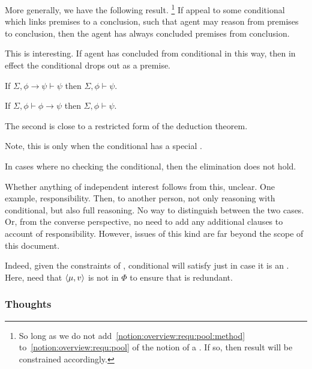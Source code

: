 \begin{note}
  More generally, we have the following result.%
  \footnote{
    So long as we do not add~\autoref{notion:overview:requ:pool:method} to~\autoref{notion:overview:requ:pool} of the notion of a \requ{}.
    If so, then result will be constrained accordingly.
  }
  If appeal to some conditional which links premises to a conclusion, such that agent may reason from premises to conclusion, then the agent has always concluded premises from conclusion.

  This is interesting.
  If agent has concluded from conditional in this way, then in effect the conditional drops out as a premise.

  If \(\Sigma, \phi \rightarrow \psi \vdash \psi\) then \(\Sigma, \phi \vdash \psi\).

  If \(\Sigma, \phi \vdash \phi \rightarrow \psi\) then \(\Sigma, \phi \vdash \psi\).

  The second is close to a restricted form of the deduction theorem.

  Note, this is only when the conditional has a special \requ{}.

  In cases where no checking the conditional, then the elimination does not hold.

  Whether anything of independent interest follows from this, unclear.
  One example, responsibility.
  Then, to another person, not only reasoning with conditional, but also full reasoning.
  No way to distinguish between the two cases.
  Or, from the converse perspective, no need to add any additional clauses to account of responsibility.
  However, issues of this kind are far beyond the scope of this document.
\end{note}

\begin{note}
  Indeed, given the constraints of , conditional will satisfy just in case it is an \itp{}.
  Here, need that \(\langle \mu, v \rangle\) is not in \(\Phi\) to ensure that  is redundant.
\end{note}

\subsubsection{Thoughts}
\label{sec:thoughts}


